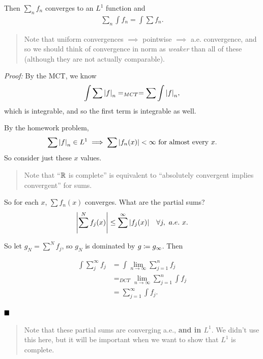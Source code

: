 Then \(\sum_n f_n\) converges to an \(L^1\) function and
\begin{align*}
\sum_n \int f_n = \int \sum f_n
.\end{align*}

\begin{quote}
Note that uniform convergences \(\implies\) pointwise \(\implies\) a.e.
convergence, and so we should think of convergence in norm as
\emph{weaker} than all of these (although they are not actually
comparable).
\end{quote}

\emph{Proof:} By the MCT, we know
\begin{align*}
\int \sum {\left\lvert {f} \right\rvert}_n =_{MCT} = \sum \int {\left\lvert {f} \right\rvert}_n
,\end{align*} which is integrable, and so the first term is integrable
as well.

By the homework problem,
\begin{align*}
\sum {\left\lvert {f} \right\rvert}_n \in L^1 \implies \sum {\left\lvert {f_n(x)} \right\rvert} < \infty \text{ for almost every } x
.\end{align*} So consider just these \(x\) values.

\begin{quote}
Note that ``\({\mathbb{R}}\) is complete'' is equivalent to ``absolutely
convergent implies convergent'' for sums.
\end{quote}

So for each \(x\), \(\sum f_n(x)\) converges. What are the partial sums?
\begin{align*}
{\left\lvert {\sum^N f_j(x)} \right\rvert} \leq \sum^\infty {\left\lvert {f_j(x)} \right\rvert} \quad \forall j,~~a.e.~x.
\end{align*}

So let \(g_N = \sum^N f_j\), so \(g_N\) is dominated by
\(g \coloneqq g_\infty\). Then

\begin{align*}
\int \sum_j^\infty f_j 
&= \int \lim_{n\to\infty} \sum_{j=1}^n f_j \\
&=_{DCT} \lim_{n\to\infty} \sum_{j=1}^n \int f_j \\
&= \sum_{j=1}^\infty \int f_j
.\end{align*}

\(\qed\)

\begin{quote}
Note that these partial sums are converging a.e., \textbf{and in
\(L^1\)}. We didn't use this here, but it will be important when we want
to show that \(L^1\) is complete.
\end{quote}

